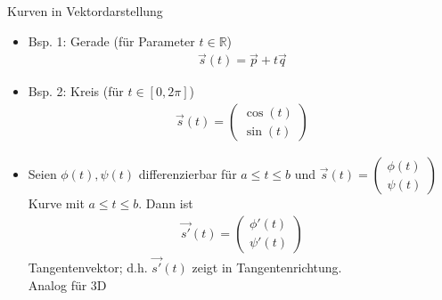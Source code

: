 \documentclass{beamer}
\begin{document}
\begin{frame}{Kurven in Vektordarstellung}
  \begin{itemize}

        \item Bsp. 1: Gerade (für Parameter $t \in \mathbb{R}$)\\
      \begin{align}
        \vec{s} (t) = \vec{p} + t \vec{q}
      \end{align}
        \item Bsp. 2: Kreis (für $t \in [0, 2\pi]$)\\
      \begin{align}
        \vec{s} (t) = \left( \begin{matrix} \cos (t) \\ \sin (t) \end{matrix} \right)
      \end{align}
    
    \item Seien $\phi (t) , \psi (t)$ differenzierbar für $a \le t \le b$
    und $\vec{s} (t) = \left( \begin{matrix} \phi (t) \\ \psi (t) \end{matrix} \right)$
    Kurve mit $a \le t \le b$. Dann ist
      \begin{align}
        \vec{s'} (t) = \begin{pmatrix} \phi' (t) \\ \psi' (t) \end{pmatrix}
      \end{align}
    Tangentenvektor; d.h. $\vec{s'} (t)$ zeigt in Tangentenrichtung. \\
    Analog für 3D
    

\end{itemize}
\end{frame}
\end{document}
